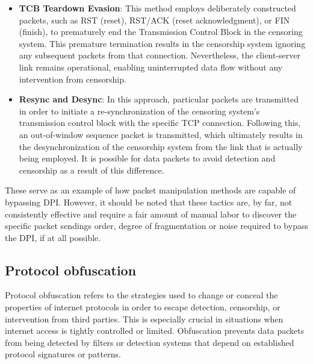 \documentclass[12pt, fleqn, a4paper]{article}
\begin{document}
\begin{itemize}
  \item \textbf{TCB Teardown Evasion}: This method employs deliberately constructed packets, such as RST (reset), RST/ACK (reset acknowledgment), or FIN (finish), to prematurely end the Transmission Control Block in the censoring system. This premature termination results in the censorship system ignoring any subsequent packets from that connection. Nevertheless, the client-server link remains operational, enabling uninterrupted data flow without any intervention from censorship. \citep{tcbbreakdown}
  \item \textbf{Resync and Desync}: In this approach, particular packets are transmitted in order to initiate a re-synchronization of the censoring system's transmission control block with the specific TCP connection. Following this, an out-of-window sequence packet is transmitted, which ultimately results in the desynchronization of the censorship system from the link that is actually being employed. It is possible for data packets to avoid detection and censorship as a result of this difference. \citep{tcpevasion}
\end{itemize}

These serve as an example of how packet manipulation methods are capable of bypassing DPI. However, it should be noted that these tactics are, by far, not consistently effective and require a fair amount of manual labor to discover the specific packet sendings order, degree of fragmentation or noise required to bypass the DPI, if at all possible. 

\subsection{Protocol obfuscation}
Protocol obfuscation refers to the strategies used to change or conceal the properties of internet protocols in order to escape detection, censorship, or intervention from third parties. This is especially crucial in situations when internet access is tightly controlled or limited. Obfuscation prevents data packets from being detected by filters or detection systems that depend on established protocol signatures or patterns.
\end{document}
